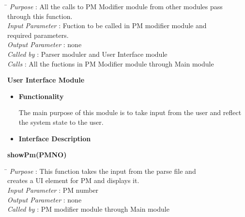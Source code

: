 \documentclass[a4paper,11pt]{article}
\begin{document}
\begin{itemize}
\begin{tabbing}
\hspace*{4cm}\= \kill
 \textit{Purpose} \> : All the calls to PM Modifier module from other modules pass \\ \>through this function.\\
  \textit{Input Parameter} \> : Fuction to be called in PM modifier module and \\ \>required parameters. \\
  \textit{Output Parameter} \> : none \\
  \textit{Called by} \> : Parser moduler and User Interface module \\
  \textit{Calls} \> : All the fuctions in PM Modifier module through Main module\\
\end{tabbing}
\end{itemize}
\textbf{User Interface Module}
\begin{itemize}
 \item \textbf{Functionality}
 
 The main purpose of this module is to take input from the user and reflect the system state to the user.
  \item \textbf{Interface Description}
  \end{itemize}
  \textbf{showPm(PM\textunderscore NO)} 
\begin{tabbing}
\hspace*{4cm}\= \kill
 \textit{Purpose} \> : This function takes the input from the parse file and \\ \>creates a UI element for PM and displays it.\\
  \textit{Input Parameter} \> : PM number \\
  \textit{Output Parameter} \> : none \\
  \textit{Called by} \> : PM modifier module through Main module
  
\end{tabbing}
\end{document}
